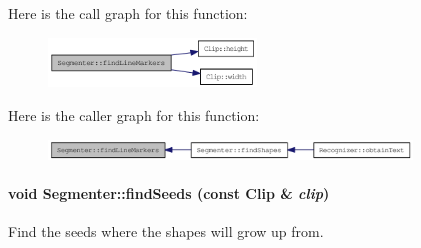 Here is the call graph for this function:\nopagebreak
\begin{figure}[H]
\begin{center}
\leavevmode
\includegraphics[width=157pt]{class_segmenter_ad8893282742e811dd7fff172ec03c85_cgraph}
\end{center}
\end{figure}


Here is the caller graph for this function:\nopagebreak
\begin{figure}[H]
\begin{center}
\leavevmode
\includegraphics[width=274pt]{class_segmenter_ad8893282742e811dd7fff172ec03c85_icgraph}
\end{center}
\end{figure}
\hypertarget{class_segmenter_bacab187b543a51c5322c01fc0a29ffb}{
\paragraph[{findSeeds}]{\setlength{\rightskip}{0pt plus 5cm}void Segmenter::findSeeds (const {\bf Clip} \& {\em clip})}\hfill}
\label{class_segmenter_bacab187b543a51c5322c01fc0a29ffb}


Find the seeds where the shapes will grow up from. 

